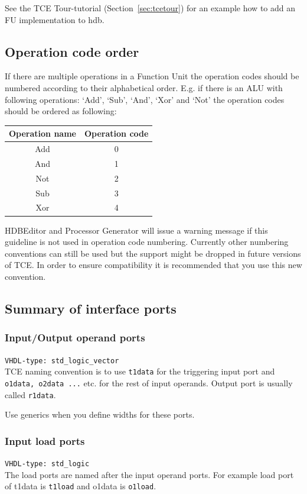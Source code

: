 \documentclass[twoside]{tceusermanual}
\begin{document}
See the TCE Tour-tutorial (Section~\ref{sec:tcetour}) for an example how to
add an FU implementation to hdb.

\subsection{Operation code order}
\label{sec:opcodeorder}
If there are multiple operations in a Function Unit the operation codes
should be numbered according to their alphabetical order. E.g. if there is
an ALU with following operations: `Add', `Sub', `And', `Xor' and `Not' the
operation codes should be ordered as following:

\begin{tabular}{|c|c|}
 \hline
 Operation name & Operation code \\ \hline
 Add & 0 \\ \hline
 And & 1 \\ \hline
 Not & 2 \\ \hline
 Sub & 3 \\ \hline
 Xor & 4 \\ \hline
\end{tabular}

HDBEditor and Processor Generator will issue a warning message if this
guideline is not used in operation code numbering. Currently other
numbering conventions can still be used but the support might be dropped
in future versions of TCE. In order to ensure compatibility it is recommended
that you use this new convention.


\subsection{Summary of interface ports}
\subsubsection{Input/Output operand ports}
\verb|VHDL-type: std_logic_vector| \\
TCE naming convention is to use \verb|t1data| for the triggering input port
and \verb|o1data, o2data ...| etc. for the rest of input operands. Output port
is usually called \verb|r1data|.

Use generics when you define widths for these ports.

\subsubsection{Input load ports}
\verb|VHDL-type: std_logic| \\
The load ports are named after the input operand ports. For example load port
of t1data is \verb|t1load| and o1data is \verb|o1load|.
\end{document}
